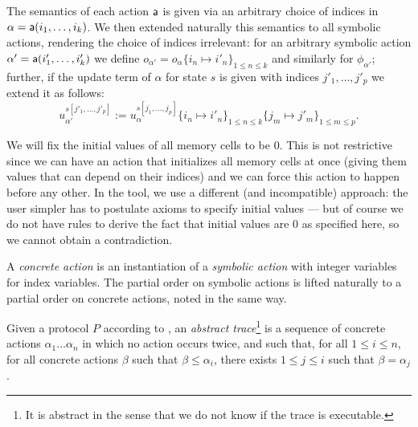 
The semantics of each action $\textsf{a}$ is given via an arbitrary
choice of indices in $\alpha = \textsf{a}(i_1,\ldots,i_k)$.
We then extended naturally this semantics to all symbolic actions,
rendering the choice of indices irrelevant:
for an arbitrary symbolic action $\alpha' =
\textsf{a}(i'_1,\ldots,i'_k)$ we define
$o_{\alpha'} = o_\alpha\{i_n\mapsto i'_n\}_{1\leq n \leq k}$
and similarly for $\phi_{\alpha'}$;
further, if the update term of $\alpha$ for state $s$ is given
with indices $j'_1,\ldots,j'_p$ we extend it as follows:
$$ u_{\alpha'}^{s[j'_1,\ldots,j'_p]} :=
   u_\alpha^{s[j_1,\ldots,j_p]}\{i_n\mapsto i'_n\}_{1 \leq n \leq k}
                                \{j_m\mapsto j'_m\}_{1 \leq m \leq p}.$$

\begin{remark}
  We will fix the initial values of all memory cells to be $0$.
  This is not restrictive since we can have an action that initializes
  all memory cells at once (giving them values that can depend on their
  indices) and we can force this action to happen before any other.
  In the tool, we use a different (and incompatible) approach:
  the user simpler has to postulate axioms to specify initial values
  --- but of course we do not have rules to derive the fact that initial
  values are $0$ as specified here, so we cannot obtain a contradiction.
\end{remark}

\begin{definition}
  A \emph{concrete action} is an instantiation of a \emph{symbolic action}
  with integer variables for index variables. The partial order on symbolic
  actions is lifted naturally to a partial order on concrete actions, noted
  in the same way.
\end{definition}

\begin{definition}
  \label{def:trace}
  Given a protocol $P$ according to ,
  an \emph{abstract trace}\footnote{
    It is abstract in the sense that we do not know if the trace
    is executable.} is a sequence of concrete actions
  $\alpha_1 \dots \alpha_n$
  in which no action occurs twice, and such that,
  for all $1 \leq i \leq n$,
  for all concrete actions $\beta$ such that $\beta \leq \alpha_i$,
  there exists $1 \leq j \leq i$ such that $\beta = \alpha_j$.
\end{definition}

